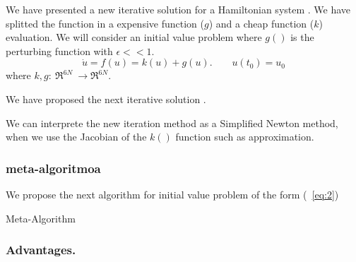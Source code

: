 We have presented a new iterative solution for a Hamiltonian system \cite{Makazaga2015a}. We have splitted the function in a expensive function ($g$) and a cheap function ($k$) evaluation. We will consider an initial value problem where $g()$ is the perturbing function with $\epsilon<<1$.
\begin{equation} \label{eq:2}
{\dot{u}}=f(u)= k(u)+g(u).  \ \ \ \ \ \ \ \ \ u(t_0)=u_0
\end{equation}
where $k,g: \ {{\Re}}^{6N} \ \longrightarrow {{\Re}}^{6N}.$

\vspace{5mm}
We have proposed the next iterative solution \cite{Makazaga2015a}.\newline

\begin{algorithm}[H]
\end{algorithm}

We can interprete the new iteration method as a Simplified Newton method, when we use the Jacobian of the $k()$ function such as approximation.

\subsubsection*{meta-algoritmoa}

We propose the next algorithm for initial value problem of the form (~\ref{eq:2})

\vspace{5mm} %
\begin{algorithm}[H]

 \caption{Meta-Algorithm}
\end{algorithm}


\subsubsection*{Advantages.}

